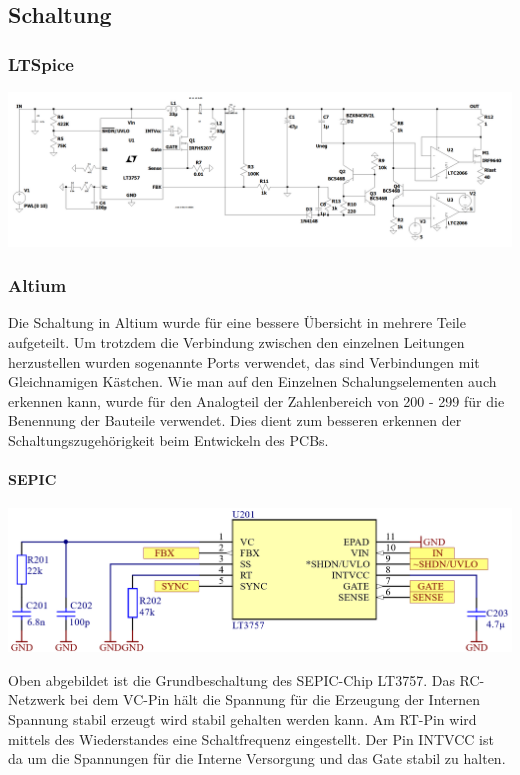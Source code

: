 \documentclass[paper=a4, 12pt]{scrreprt}
\begin{document}
		\subsection{Schaltung}
			\subsubsection{LTSpice}
			\begin{adjustbox}{center,caption={Simulationsschaltung des Analogteils in LTSpice},label={fig:LTSpice-Schaltung-Analogteil},nofloat=figure,vspace=\bigskipamount}
				\includegraphics[width=\textwidth]{img/LTSpice_Schaltung_Analogteil.PNG}
			\end{adjustbox}
			\pagebreak
			\subsubsection{Altium}
			Die Schaltung in Altium wurde für eine bessere Übersicht in mehrere Teile aufgeteilt. Um trotzdem die Verbindung zwischen den einzelnen Leitungen herzustellen wurden sogenannte Ports verwendet, das sind Verbindungen mit Gleichnamigen Kästchen. Wie man auf den Einzelnen Schalungselementen auch erkennen kann, wurde für den Analogteil der Zahlenbereich von 200 - 299 für die Benennung der Bauteile verwendet. Dies dient zum besseren erkennen der Schaltungszugehörigkeit beim Entwickeln des PCBs. 
			\paragraph{SEPIC}
			\begin{adjustbox}{center,caption={Grundbeschaltung des LT3757},label={fig:LT3757-Grundbeschaltung},nofloat=figure,vspace=\bigskipamount}
				\includegraphics[width=\textwidth]{img/SEPIC_Altium.PNG}
			\end{adjustbox}
			Oben abgebildet ist die Grundbeschaltung des SEPIC-Chip LT3757. Das RC-Netzwerk bei dem VC-Pin hält die Spannung für die Erzeugung der Internen Spannung stabil erzeugt wird stabil gehalten werden kann. Am RT-Pin wird mittels des Wiederstandes eine Schaltfrequenz eingestellt. Der Pin INTVCC ist da um die Spannungen für die Interne Versorgung und das Gate stabil zu halten.
\end{document}
